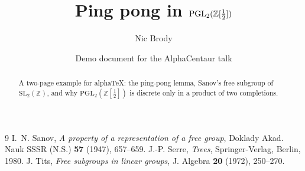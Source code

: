 \documentclass[11pt]{amsart}
\title{Ping pong in $\PGL_2(\Z[\tfrac12])$}
\author{Nic Brody}
\date{Demo document for the AlphaCentaur talk}
\theoremstyle{definition}
\theoremstyle{remark}
\newcommand{\Z}{\mathbb{Z}}
\newcommand{\PGL}{\mathrm{PGL}}
\newcommand{\SL}{\mathrm{SL}}
\begin{document}
\begin{abstract}
A two-page example for alphaTeX: the ping-pong lemma, Sanov's free subgroup of
$\SL_2(\Z)$, and why $\PGL_2(\Z[\frac12])$ is discrete only in a product of two
completions.
\end{abstract}

\maketitle





\begin{thebibliography}{9}
 I.~N. Sanov, \emph{A property of a representation of a free
  group}, Doklady Akad. Nauk SSSR (N.S.) \textbf{57} (1947), 657--659.
 J.-P. Serre, \emph{Trees}, Springer-Verlag, Berlin, 1980.
 J. Tits, \emph{Free subgroups in linear groups}, J. Algebra
  \textbf{20} (1972), 250--270.
\end{thebibliography}
\end{document}
